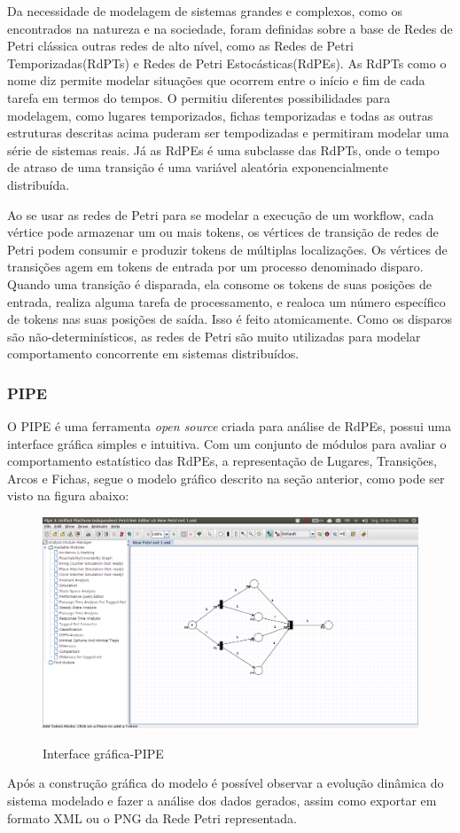 			Da necessidade de modelagem de sistemas grandes e complexos, como os encontrados na natureza e na sociedade, foram definidas sobre a base de Redes de Petri clássica outras redes de alto nível, como as Redes de Petri Temporizadas(RdPTs) e Redes de Petri Estocásticas(RdPEs). As RdPTs como o nome diz permite modelar situações que ocorrem entre o início e fim de cada tarefa em termos do tempos. O permitiu diferentes possibilidades para modelagem, como lugares temporizados, fichas temporizadas e todas as outras estruturas descritas acima puderam ser tempodizadas e permitiram modelar uma série de sistemas reais. Já as RdPEs é uma subclasse das RdPTs, onde o tempo de atraso de uma transição é uma variável aleatória exponencialmente distribuída\cite{Braghetto2011}. 
		
	Ao se usar as redes de Petri para se modelar a execução de um workflow, cada vértice pode armazenar um ou mais tokens, os vértices de transição de redes de Petri podem consumir e produzir tokens de múltiplas localizações. Os vértices de transições agem em tokens de entrada por um processo denominado disparo. Quando uma transição é disparada, ela consome os tokens de suas posições de entrada, realiza alguma tarefa de processamento, e realoca um número específico de tokens nas suas posições de saída. Isso é feito atomicamente. Como os disparos são não-determinísticos, as redes de Petri são muito utilizadas para modelar comportamento concorrente em sistemas distribuídos. 	
			
		\subsubsection{PIPE}
			
			O PIPE\cite{PIPE} é uma ferramenta \textit{open source} criada para análise de RdPEs, possui uma interface gráfica simples e intuitiva. Com um conjunto de módulos para avaliar o comportamento estatístico das RdPEs, a representação de Lugares, Transições, Arcos e Fichas, segue o modelo gráfico descrito na seção anterior, como pode ser visto na figura abaixo:			
						
			\begin{figure}[h]
				\center
				\caption{Interface gráfica-PIPE}
				\includegraphics[width=1\textwidth]{img/pipe.jpg}
				\label{fig:PIPE}
			\end{figure}						
			
		Após a construção gráfica do modelo é possível observar a evolução dinâmica do sistema modelado e fazer a análise dos dados gerados, assim como exportar em formato XML ou o PNG da Rede Petri representada.